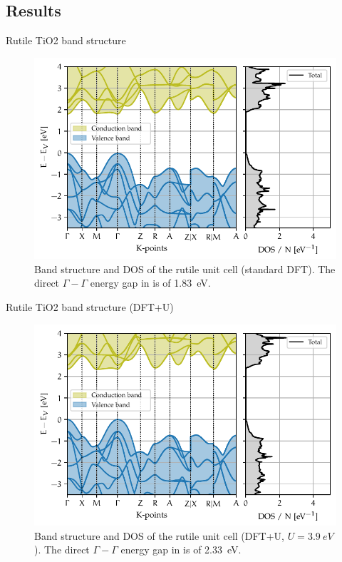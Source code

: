 \documentclass[11pt, xcolor=dvipsnames, aspectratio=43]{beamer}
\begin{document}
\subsection{Results}

\begin{frame}{Rutile TiO2 band structure}
    \begin{figure}
        \centering
        \includegraphics[height=0.7\textheight]{figures/unit.pdf}
        \caption{Band structure and DOS of the rutile unit cell (standard DFT). The direct $\Gamma - \Gamma$ energy gap in is of \SI{1.83}{eV}.}
        \label{fig:bands_unit}
    \end{figure}
\end{frame}

\begin{frame}{Rutile TiO2 band structure (DFT+U)}
    \begin{figure}
        \centering
        \includegraphics[height=0.7\textheight]{figures/unit+u.pdf}
        \caption{Band structure and DOS of the rutile unit cell (DFT+U, $U=\SI{3.9}{eV}$). The direct $\Gamma - \Gamma$ energy gap in is of \SI{2.33}{eV}.}
        \label{fig:bands_unit}
    \end{figure}
\end{frame}
\end{document}
